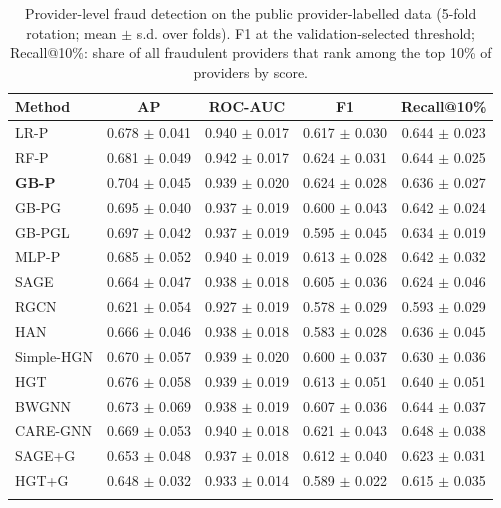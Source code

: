 \documentclass[pdflatex,sn-vancouver-num]{sn-jnl}
\begin{document}
\begin{table}[h]
\caption{Provider-level fraud detection on the public provider-labelled data (5-fold rotation; mean $\pm$ s.d. over folds). F1 at the validation-selected threshold; Recall@10\%: share of all fraudulent providers that rank among the top 10\% of providers by score.}\label{tab:kaggle}
\footnotesize
\begin{tabular}{@{}lcccc@{}}
\toprule
Method & AP & ROC-AUC & F1 & Recall@10\% \\
\midrule
LR-P & 0.678 $\pm$ 0.041 & 0.940 $\pm$ 0.017 & 0.617 $\pm$ 0.030 & 0.644 $\pm$ 0.023 \\
RF-P & 0.681 $\pm$ 0.049 & 0.942 $\pm$ 0.017 & 0.624 $\pm$ 0.031 & 0.644 $\pm$ 0.025 \\
\textbf{GB-P} & 0.704 $\pm$ 0.045 & 0.939 $\pm$ 0.020 & 0.624 $\pm$ 0.028 & 0.636 $\pm$ 0.027 \\
GB-PG & 0.695 $\pm$ 0.040 & 0.937 $\pm$ 0.019 & 0.600 $\pm$ 0.043 & 0.642 $\pm$ 0.024 \\
GB-PGL & 0.697 $\pm$ 0.042 & 0.937 $\pm$ 0.019 & 0.595 $\pm$ 0.045 & 0.634 $\pm$ 0.019 \\
MLP-P & 0.685 $\pm$ 0.052 & 0.940 $\pm$ 0.019 & 0.613 $\pm$ 0.028 & 0.642 $\pm$ 0.032 \\
SAGE & 0.664 $\pm$ 0.047 & 0.938 $\pm$ 0.018 & 0.605 $\pm$ 0.036 & 0.624 $\pm$ 0.046 \\
RGCN & 0.621 $\pm$ 0.054 & 0.927 $\pm$ 0.019 & 0.578 $\pm$ 0.029 & 0.593 $\pm$ 0.029 \\
HAN & 0.666 $\pm$ 0.046 & 0.938 $\pm$ 0.018 & 0.583 $\pm$ 0.028 & 0.636 $\pm$ 0.045 \\
Simple-HGN & 0.670 $\pm$ 0.057 & 0.939 $\pm$ 0.020 & 0.600 $\pm$ 0.037 & 0.630 $\pm$ 0.036 \\
HGT & 0.676 $\pm$ 0.058 & 0.939 $\pm$ 0.019 & 0.613 $\pm$ 0.051 & 0.640 $\pm$ 0.051 \\
BWGNN & 0.673 $\pm$ 0.069 & 0.938 $\pm$ 0.019 & 0.607 $\pm$ 0.036 & 0.644 $\pm$ 0.037 \\
CARE-GNN & 0.669 $\pm$ 0.053 & 0.940 $\pm$ 0.018 & 0.621 $\pm$ 0.043 & 0.648 $\pm$ 0.038 \\
SAGE+G & 0.653 $\pm$ 0.048 & 0.937 $\pm$ 0.018 & 0.612 $\pm$ 0.040 & 0.623 $\pm$ 0.031 \\
HGT+G & 0.648 $\pm$ 0.032 & 0.933 $\pm$ 0.014 & 0.589 $\pm$ 0.022 & 0.615 $\pm$ 0.035 \\
\botrule
\end{tabular}
\end{table}
\end{document}
